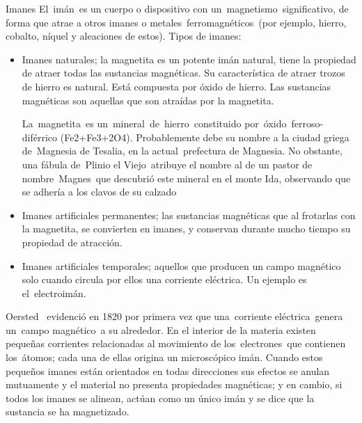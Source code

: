 \newpage %
\begin{myblock}{Imanes}
El imán es un cuerpo o dispositivo con un magnetismo significativo, de forma que atrae a otros imanes o metales ferromagnéticos (por ejemplo, hierro, cobalto, níquel y aleaciones de estos). 
\vspace{2mm} Tipos de imanes:
\begin{itemize}
\item Imanes naturales; la magnetita es un potente imán natural, tiene la propiedad de atraer todas las sustancias magnéticas. Su característica de atraer trozos de hierro es natural. Está compuesta por óxido de hierro. Las sustancias magnéticas son aquellas que son atraídas por la magnetita.

La magnetita es un mineral de hierro constituido por óxido ferroso-diférrico (Fe2+Fe3+2O4). Probablemente debe su nombre a la ciudad griega de Magnesia de Tesalia, en la actual prefectura de Magnesia. No obstante, una fábula de Plinio el Viejo atribuye el nombre al de un pastor de nombre Magnes que descubrió este mineral en el monte Ida, observando que se adhería a los clavos de su calzado

\item Imanes artificiales permanentes; las sustancias magnéticas que al frotarlas con la magnetita, se convierten en imanes, y conservan durante mucho tiempo su propiedad de atracción.
\item Imanes artificiales temporales; aquellos que producen un campo magnético solo cuando circula por ellos una corriente eléctrica. Un ejemplo es el electroimán.
\end{itemize}

\vspace{2mm} Oersted  evidenció en 1820 por primera vez que una corriente eléctrica genera un campo magnético a su alrededor. En el interior de la materia existen pequeñas corrientes relacionadas al movimiento de los electrones que contienen los átomos; cada una de ellas origina un microscópico imán. Cuando estos pequeños imanes están orientados en todas direcciones sus efectos se anulan mutuamente y el material no presenta propiedades magnéticas; y en cambio, si todos los imanes se alinean, actúan como un único imán y se dice que la sustancia se ha magnetizado.


\end{myblock}
